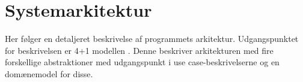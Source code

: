 \chapter{Systemarkitektur}
Her følger en detaljeret beskrivelse af programmets arkitektur. Udgangspunktet for beskrivelsen er 4+1 modellen \citep{fourPlusOne}. Denne beskriver arkitekturen med fire forskellige abstraktioner med udgangspunkt i use case-beskrivelserne og en domænemodel for disse.






